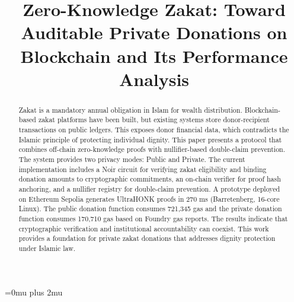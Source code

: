 \documentclass[conference]{IEEEtran}
\begin{document}
\Urlmuskip=0mu plus 2mu

\title{Zero-Knowledge Zakat: Toward Auditable Private Donations on Blockchain and Its Performance Analysis}

\author{
\and
{}
}

\maketitle

\begin{abstract}
Zakat is a mandatory annual obligation in Islam for wealth distribution\cite{b_baznas}\cite{b_isf_covid}. Blockchain-based zakat platforms have been built, but existing systems store donor-recipient transactions on public ledgers\cite{b_zakat_acm}\cite{b_zakat_transparency}. This exposes donor financial data, which contradicts the Islamic principle of protecting individual dignity\cite{b_maqasid_data}\cite{b_maqasid_privacy}. This paper presents a protocol that combines off-chain zero-knowledge proofs with nullifier-based double-claim prevention\cite{b_zkp_financial}\cite{b_aztec}. The system provides two privacy modes: Public and Private. The current implementation includes a Noir circuit for verifying zakat eligibility and binding donation amounts to cryptographic commitments\cite{b_noir}, an on-chain verifier for proof hash anchoring, and a nullifier registry for double-claim prevention\cite{b_zkp_blockchain}. A prototype deployed on Ethereum Sepolia generates UltraHONK proofs in 270 ms (Barretenberg, 16-core Linux)\cite{b_aztec}. The public donation function consumes 721,345 gas and the private donation function consumes 170,710 gas based on Foundry gas reports. The results indicate that cryptographic verification and institutional accountability can coexist\cite{b_zkfi}. This work provides a foundation for private zakat donations that addresses dignity protection under Islamic law\cite{b_maqasid_privacy}\cite{b_maqasid_data}.
\end{abstract}
\end{document}
